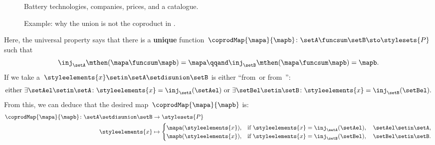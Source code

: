 \begin{example}
    \begin{figure*}[tbh]
        \centering
        \caption{Battery technologies, companies, prices, and a catalogue.}
        \label{fig:coprod_batteries_1}
    \end{figure*}

    \begin{figure*}[tbh]
        \centering
        \caption{Example: why the union is not the coproduct in \Set.}
        \label{fig:coprod_batteries_2}
    \end{figure*}

    Here, the universal property says that there is a \textbf{unique} function~$\coprodMap{\mapa}{\mapb}\colon \setA \funcsum \setB \sto \stylesets{P}$ such that
    \begin{equation}
        \label{eq:exa-batt-factoring-maps}
        \inj_\setA\mthen (\mapa \funcsum \mapb)=\mapa
        \qqand
        \inj_\setB\mthen (\mapa \funcsum \mapb)=\mapb.
    \end{equation}
    If we take a~$\styleelements{x}\setin \setA \setdisunion \setB$ is either ``from~\setA or from~\setB'':
    \begin{equation}
        \label{eq:exa-batt-explain-sum-map}
        \text{either } \exists \setAel\setin \setA\colon \styleelements{x}=\inj_\setA(\setAel) \text{ or }\exists \setBel\setin \setB\colon \styleelements{x}=\inj_\setB(\setBel).
    \end{equation}
    From this, we can deduce that the desired map~$\coprodMap{\mapa}{\mapb}$ is:
    \begin{equation}
        \label{eq:exa-batt-def-sum-map}
        \begin{aligned}
            \coprodMap{\mapa}{\mapb} \colon  \setA \setdisunion \setB & \to \stylesets{P} \\
            \styleelements{x}                                         & \mapsto
            \begin{cases}
                \mapa(\styleelements{x}), & \text{if } \styleelements{x}=\inj_\setA(\setAel),\quad \setAel \setin \setA, \\
                \mapb(\styleelements{x}), & \text{if } \styleelements{x}=\inj_\setB(\setBel),\quad \setBel \setin \setB.
            \end{cases}
        \end{aligned}
    \end{equation}

\end{example}
